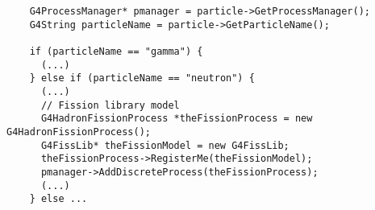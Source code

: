 \begin{verbatim}
    G4ProcessManager* pmanager = particle->GetProcessManager();
    G4String particleName = particle->GetParticleName();

    if (particleName == "gamma") {
      (...)
    } else if (particleName == "neutron") {
      (...)
      // Fission library model
      G4HadronFissionProcess *theFissionProcess = new G4HadronFissionProcess();
      G4FissLib* theFissionModel = new G4FissLib;
      theFissionProcess->RegisterMe(theFissionModel);
      pmanager->AddDiscreteProcess(theFissionProcess);
      (...)
    } else ...
\end{verbatim}
